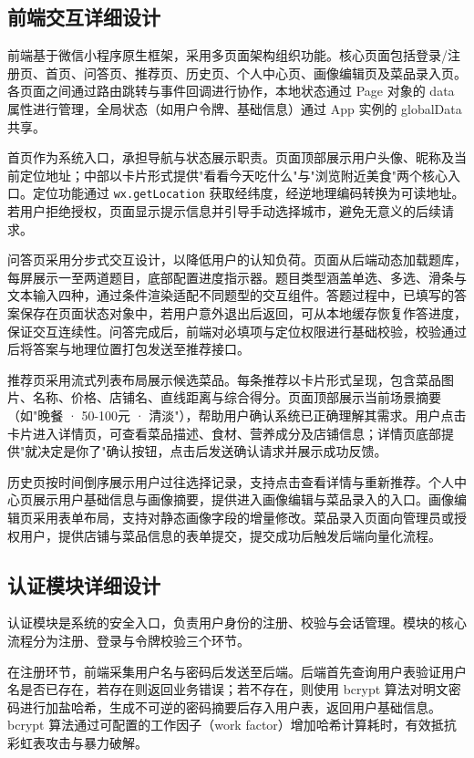 \subsection{前端交互详细设计}

前端基于微信小程序原生框架，采用多页面架构组织功能。核心页面包括登录/注册页、首页、问答页、推荐页、历史页、个人中心页、画像编辑页及菜品录入页。各页面之间通过路由跳转与事件回调进行协作，本地状态通过 Page 对象的 data 属性进行管理，全局状态（如用户令牌、基础信息）通过 App 实例的 globalData 共享。

首页作为系统入口，承担导航与状态展示职责。页面顶部展示用户头像、昵称及当前定位地址；中部以卡片形式提供"看看今天吃什么"与"浏览附近美食"两个核心入口。定位功能通过 \texttt{wx.getLocation} 获取经纬度，经逆地理编码转换为可读地址。若用户拒绝授权，页面显示提示信息并引导手动选择城市，避免无意义的后续请求。

问答页采用分步式交互设计，以降低用户的认知负荷。页面从后端动态加载题库，每屏展示一至两道题目，底部配置进度指示器。题目类型涵盖单选、多选、滑条与文本输入四种，通过条件渲染适配不同题型的交互组件。答题过程中，已填写的答案保存在页面状态对象中，若用户意外退出后返回，可从本地缓存恢复作答进度，保证交互连续性。问答完成后，前端对必填项与定位权限进行基础校验，校验通过后将答案与地理位置打包发送至推荐接口。

推荐页采用流式列表布局展示候选菜品。每条推荐以卡片形式呈现，包含菜品图片、名称、价格、店铺名、直线距离与综合得分。页面顶部展示当前场景摘要（如"晚餐 · 50-100元 · 清淡"），帮助用户确认系统已正确理解其需求。用户点击卡片进入详情页，可查看菜品描述、食材、营养成分及店铺信息；详情页底部提供"就决定是你了"确认按钮，点击后发送确认请求并展示成功反馈。

历史页按时间倒序展示用户过往选择记录，支持点击查看详情与重新推荐。个人中心页展示用户基础信息与画像摘要，提供进入画像编辑与菜品录入的入口。画像编辑页采用表单布局，支持对静态画像字段的增量修改。菜品录入页面向管理员或授权用户，提供店铺与菜品信息的表单提交，提交成功后触发后端向量化流程。

\subsection{认证模块详细设计}

认证模块是系统的安全入口，负责用户身份的注册、校验与会话管理。模块的核心流程分为注册、登录与令牌校验三个环节。

在注册环节，前端采集用户名与密码后发送至后端。后端首先查询用户表验证用户名是否已存在，若存在则返回业务错误；若不存在，则使用 bcrypt 算法对明文密码进行加盐哈希，生成不可逆的密码摘要后存入用户表，返回用户基础信息。bcrypt 算法通过可配置的工作因子（work factor）增加哈希计算耗时，有效抵抗彩虹表攻击与暴力破解。

